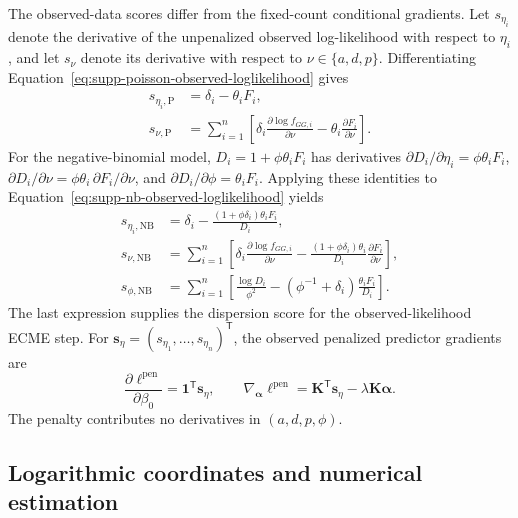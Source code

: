 \documentclass[11pt]{article}
\begin{document}
The observed-data scores differ from the fixed-count conditional gradients. Let $s_{\eta_i}$ denote the derivative of the unpenalized observed log-likelihood with respect to $\eta_i$, and let $s_\nu$ denote its derivative with respect to $\nu\in\{a,d,p\}$. Differentiating Equation~\eqref{eq:supp-poisson-observed-loglikelihood} gives
\begin{equation}
\begin{aligned}
s_{\eta_i,\mathrm P}&=\delta_i-\theta_iF_i,\\
s_{\nu,\mathrm P}
&=\sum_{i=1}^{n}\left[
\delta_i\frac{\partial\log f_{GG,i}}{\partial\nu}
-\theta_i\frac{\partial F_i}{\partial\nu}
\right].
\end{aligned}
\label{eq:supp-poisson-score}
\end{equation}
For the negative-binomial model, $D_i=1+\phi\theta_iF_i$ has derivatives $\partial D_i/\partial\eta_i=\phi\theta_iF_i$, $\partial D_i/\partial\nu=\phi\theta_i\,\partial F_i/\partial\nu$, and $\partial D_i/\partial\phi=\theta_iF_i$. Applying these identities to Equation~\eqref{eq:supp-nb-observed-loglikelihood} yields
\begin{equation}
\begin{aligned}
s_{\eta_i,\mathrm{NB}}
&=\delta_i-\frac{(1+\phi\delta_i)\theta_iF_i}{D_i},\\
s_{\nu,\mathrm{NB}}
&=\sum_{i=1}^{n}\left[
\delta_i\frac{\partial\log f_{GG,i}}{\partial\nu}
-\frac{(1+\phi\delta_i)\theta_i}{D_i}
\frac{\partial F_i}{\partial\nu}
\right],\\
s_{\phi,\mathrm{NB}}
&=\sum_{i=1}^{n}\left[
\frac{\log D_i}{\phi^2}
-(\phi^{-1}+\delta_i)\frac{\theta_iF_i}{D_i}
\right].
\end{aligned}
\label{eq:supp-nb-score}
\end{equation}
The last expression supplies the dispersion score for the observed-likelihood ECME step. For $\bm s_\eta=(s_{\eta_1},\ldots,s_{\eta_n})^{\mathsf T}$, the observed penalized predictor gradients are
\begin{equation}
\frac{\partial\ell^{\mathrm{pen}}}{\partial\beta_0}
=\bm1^{\mathsf T}\bm s_\eta,
\qquad
\nabla_{\bm\alpha}\ell^{\mathrm{pen}}
=\bm K^{\mathsf T}\bm s_\eta-\lambda\bm K\bm\alpha.
\label{eq:supp-observed-kernel-gradients}
\end{equation}
The penalty contributes no derivatives in $(a,d,p,\phi)$.

\subsection{Logarithmic coordinates and numerical estimation}
\end{document}
